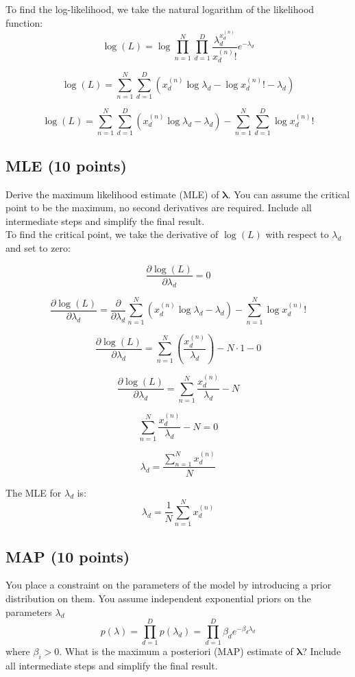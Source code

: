\documentclass[a4paper,12pt]{article}
\begin{document}
To find the log-likelihood, we take the natural logarithm of the likelihood function:
\[
\log(L) = \log \prod_{n=1}^{N} \prod_{d=1}^{D} \frac{\lambda_d^{x_d^{(n)}}}{x_d^{(n)}!} e^{-\lambda_d}
\]

\[
\log(L) = \sum_{n=1}^{N} \sum_{d=1}^{D} \left( x_d^{(n)} \log \lambda_d - \log x_d^{(n)}! - \lambda_d \right)
\]

\[
\log(L) = \sum_{n=1}^{N} \sum_{d=1}^{D} \left( x_d^{(n)} \log \lambda_d - \lambda_d \right) - \sum_{n=1}^{N} \sum_{d=1}^{D} \log x_d^{(n)}!
\]


\subsection{MLE (10 points)}
Derive the maximum likelihood estimate (MLE) of $\mathbf{\lambda}$. You can assume the critical point to be the maximum, no second derivatives are required. Include all intermediate steps and simplify the final result.
\\
To find the critical point, we take the derivative of \(\log(L)\) with respect to \(\lambda_d\) and set to zero:

\[
\frac{\partial \log(L)}{\partial \lambda_d} = 0
\]

\[
\frac{\partial \log(L)}{\partial \lambda_d} = \frac{\partial}{\partial \lambda_d} \sum_{n=1}^{N}  \left( x_d^{(n)} \log \lambda_d - \lambda_d \right) - \sum_{n=1}^{N}  \log x_d^{(n)}!
\]

\[
\frac{\partial \log(L)}{\partial \lambda_d} = \sum_{n=1}^{N}  \left(\frac{ x_d^{(n)}}{ \lambda_d} \right) - N \cdot 1 - 0
\]

\[
\frac{\partial \log(L)}{\partial \lambda_d} = \sum_{n=1}^{N} \frac{x_d^{(n)}}{\lambda_d} - N
\]

\[
\sum_{n=1}^{N} \frac{x_d^{(n)}}{\lambda_d} - N = 0
\]

\[
\lambda_d = \frac{\sum_{n=1}^{N} x_d^{(n)}}{N}
\]

The MLE for \(\lambda_d\) is:
\[
\lambda_d = \frac{1}{N} \sum_{n=1}^{N} x_d^{(n)}
\]


\subsection{MAP (10 points)}
You place a constraint on the parameters of the model by introducing a prior distribution on them. You assume independent exponential priors on the parameters $\lambda_{d}$
$$
p\left(\lambda\right)= \prod_{d=1}^{D}p\left(\lambda_d\right) = \prod_{d=1}^D\beta_de^{-\beta_d \lambda_d}
$$
where $\beta_i > 0$. What is the maximum a posteriori (MAP) estimate of $\mathbf{\lambda}$?
Include all intermediate steps and simplify the final result.
\end{document}
